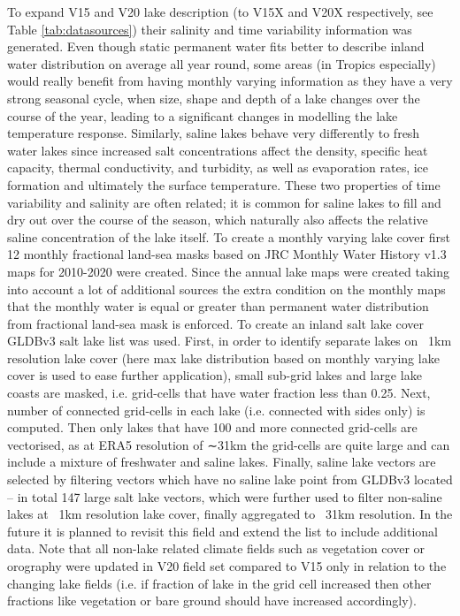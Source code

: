 \documentclass[hess, twostagejnl]{copernicus}
\begin{document}
To expand V15 and V20 lake description (to V15X and V20X respectively, see Table \ref{tab:datasources}) their salinity and time variability information was generated. Even though static permanent water fits better to describe inland water distribution on average all year round, some areas (in Tropics especially) would really benefit from having monthly varying information as they have a very strong seasonal cycle, when size, shape and depth of a lake changes over the course of the year, leading to a significant changes in modelling the lake temperature response. Similarly, saline lakes behave very differently to fresh water lakes since increased salt concentrations affect the density, specific heat capacity, thermal conductivity, and turbidity, as well as evaporation rates, ice formation and ultimately the surface temperature. These two properties of time variability and salinity are often related; it is common for saline lakes to fill and dry out over the course of the season, which naturally also affects the relative saline concentration of the lake itself. To create a monthly varying lake cover first 12 monthly fractional land-sea masks based on JRC Monthly Water History v1.3 maps for 2010-2020 were created. Since the annual lake maps were created taking into account a lot of additional sources the extra condition on the monthly maps that the monthly water is equal or greater than permanent water distribution from fractional land-sea mask is enforced. To create an inland salt lake cover GLDBv3 salt lake list was used. First, in order to identify separate lakes on ~1km resolution lake cover (here max lake distribution based on monthly varying lake cover is used to ease further application), small sub-grid lakes and large lake coasts are masked, i.e. grid-cells that have water fraction less than 0.25. Next, number of connected grid-cells in each lake (i.e. connected with sides only) is computed. Then only lakes that have 100 and more connected grid-cells are vectorised, as at ERA5 resolution of ∼31km the grid-cells are quite large and can include a mixture of freshwater and saline lakes. Finally, saline lake vectors are selected by filtering vectors which have no saline lake point from GLDBv3 located – in total 147 large salt lake vectors, which were further used to filter non-saline lakes at ~1km resolution lake cover, finally aggregated to ~31km resolution. In the future it is planned to revisit this field and extend the list to include additional data. Note that all non-lake related climate fields such as vegetation cover or orography were updated in V20 field set compared to V15 only in relation to the changing lake fields (i.e. if fraction of lake in the grid cell increased then other fractions like vegetation or bare ground should have increased accordingly). 
\end{document}
